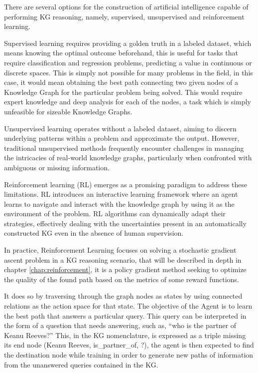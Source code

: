 There are several options for the construction of artificial intelligence capable of performing KG reasoning, namely, supervised, unsupervised and reinforcement learning.

Supervised learning requires providing a golden truth in a labeled dataset, which means knowing the optimal outcome beforehand, this is useful for tasks that require classification and regression problems, predicting a value in continuous or discrete spaces. This is simply not possible for many problems in the field, in this case, it would mean obtaining the best path connecting two given nodes of a Knowledge Graph for the particular problem being solved. This would require expert knowledge and deep analysis for each of the nodes, a task which is simply unfeasible for sizeable Knowledge Graphs.


Unsupervised learning operates without a labeled dataset, aiming to discern underlying patterns within a problem and approximate the output. However, traditional unsupervised methods frequently encounter challenges in managing the intricacies of real-world knowledge graphs, particularly when confronted with ambiguous or missing information.

Reinforcement learning (RL) emerges as a promising paradigm to address these limitations. RL introduces an interactive learning framework where an agent learns to navigate and interact with the knowledge graph by using it as the environment of the problem. RL algorithms can dynamically adapt their strategies, effectively dealing with the uncertainties present in an automatically constructed KG even in the absence of human supervision.

In practice, Reinforcement Learning focuses on solving a stochastic gradient ascent problem in a KG reasoning scenario, that will be described in depth in chapter \ref{chap:reinforcement}, it is a policy gradient method seeking to optimize the quality of the found path based on the metrics of some reward functions. 

It does so by traversing through the graph nodes as states by using connected relations as the action space for that state. The objective of the Agent is to learn the best path that answers a particular query. This query can be interpreted in the form of a question that needs answering, such as, ``who is the partner of Keanu Reeves?'' This, in the KG nomenclature, is expressed as a triple missing its end node (Keanu Reeves, is\_partner\_of, ?), the agent is then expected to find the destination node while training in order to generate new paths of information from the unanswered queries contained in the KG.

